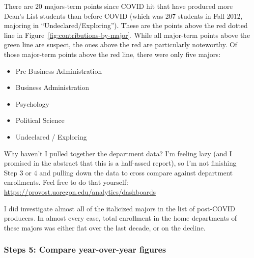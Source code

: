 \documentclass[10pt]{article}
\begin{document}
There are 20 majors-term points since COVID hit that have produced more Dean's List students than before COVID (which was 207 students in Fall 2012, majoring in ``Undeclared/Exploring''). These are the points above the red dotted line in Figure~\ref{fig:contributions-by-major}. While all major-term points above the green line are suspect, the ones above the red are particularly noteworthy. Of those major-term points above the red line, there were only five majors:

\begin{itemize}
	\item Pre-Business Administration
	\item Business Administration
	\item Psychology
	\item Political Science
	\item Undeclared / Exploring
\end{itemize}



Why haven't I pulled together the department data? I'm feeling lazy (and I promised in the abstract that this is a half-assed report), so I'm not finishing Step 3 or 4 and pulling down the data to cross compare against department enrollments. Feel free to do that yourself: \url{https://provost.uoregon.edu/analytics/dashboards}

I did investigate almost all of the italicized majors in the list of post-COVID producers. In almost every case, total enrollment in the home departments of these majors was either flat over the last decade, or on the decline.

\newpage

\subsubsection{Steps 5: Compare year-over-year figures}

\qquad


\end{document}
